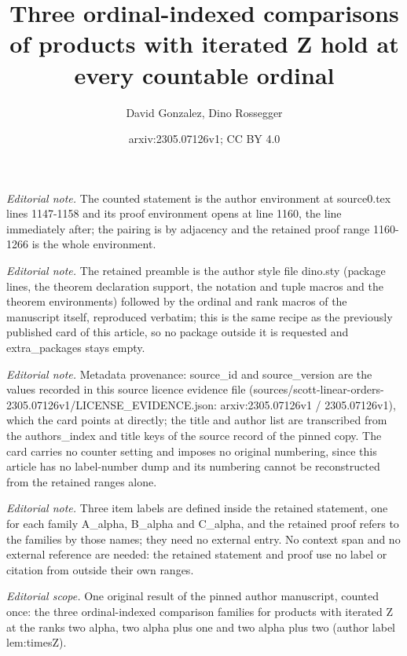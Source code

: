 \documentclass[10pt,a4paper]{amsart}
\title{Three ordinal-indexed comparisons of products with iterated Z hold at every countable ordinal}
\author{David Gonzalez, Dino Rossegger}
\date{arxiv:2305.07126v1; CC BY 4.0}
\begin{document}
\maketitle
\noindent\textit{Editorial note.} The counted statement is the author environment at source0.tex lines 1147-1158 and its proof environment opens at line 1160, the line immediately after; the pairing is by adjacency and the retained proof range 1160-1266 is the whole environment.\par\medskip
\noindent\textit{Editorial note.} The retained preamble is the author style file dino.sty (package lines, the theorem declaration support, the notation and tuple macros and the theorem environments) followed by the ordinal and rank macros of the manuscript itself, reproduced verbatim; this is the same recipe as the previously published card of this article, so no package outside it is requested and extra\_packages stays empty.\par\medskip
\noindent\textit{Editorial note.} Metadata provenance: source\_id and source\_version are the values recorded in this source licence evidence file (sources/scott-linear-orders-2305.07126v1/LICENSE\_EVIDENCE.json: arxiv:2305.07126v1 / 2305.07126v1), which the card points at directly; the title and author list are transcribed from the authors\_index and title keys of the source record of the pinned copy. The card carries no counter setting and imposes no original numbering, since this article has no label-number dump and its numbering cannot be reconstructed from the retained ranges alone.\par\medskip
\noindent\textit{Editorial note.} Three item labels are defined inside the retained statement, one for each family A\_alpha, B\_alpha and C\_alpha, and the retained proof refers to the families by those names; they need no external entry. No context span and no external reference are needed: the retained statement and proof use no label or citation from outside their own ranges.\par\medskip
\noindent\textit{Editorial scope.} One original result of the pinned author manuscript, counted once: the three ordinal-indexed comparison families for products with iterated Z at the ranks two alpha, two alpha plus one and two alpha plus two (author label lem:timesZ).\par\medskip
\end{document}
